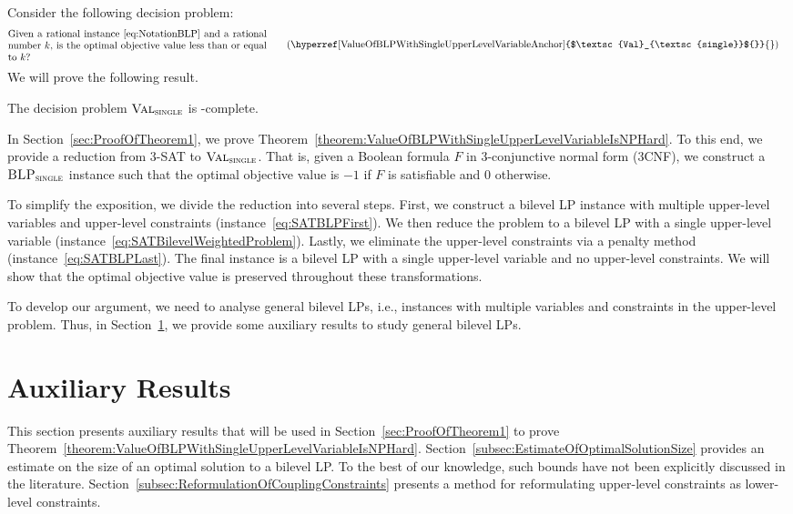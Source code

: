 \documentclass[runningheads,orivec]{llncs}
\newcommand{\MacroColor}[1]{#1}
\newcommand{\ComplexityClassStyle}[1]{#1}
\newcommand{\ClassNP}{\MacroColor{\text{\ComplexityClassStyle{NP}}}}
\newcommand{\ThreeSAT}{\MacroColor{\textsc{3-SAT}}}
\newcommand{\BLPWithSingleUpperLevelVariable}{\MacroColor{$\textsc{BLP}_{\textsc{single}}$}}
\newcommand{\ValueOfBLPWithSingleUpperLevelVariableName}{\MacroColor{$\textsc{Val}_{\textsc{single}}$}}
\newcommand{\ValueOfBLPWithSingleUpperLevelVariable}{\hyperref[ValueOfBLPWithSingleUpperLevelVariableAnchor]{\ValueOfBLPWithSingleUpperLevelVariableName{}}}
\newcommand{\SATBooleanFormula}{\MacroColor{F}}
\begin{document}
Consider the following decision problem:
\begin{align*}
& 
\parbox{0.75\textwidth}{Given a rational instance \eqref{eq:NotationBLP} and a rational 
number $k$, is the optimal objective value less than or equal to $k$?}
\label{ValueOfBLPWithSingleUpperLevelVariableAnchor}
\tag{\ValueOfBLPWithSingleUpperLevelVariable{}}
\end{align*}
We will prove the following result.

\begin{theorem}
\label{theorem:ValueOfBLPWithSingleUpperLevelVariableIsNPHard}
The decision problem \ValueOfBLPWithSingleUpperLevelVariable{} is \ClassNP{}-complete.
\end{theorem}

In Section~\ref{sec:ProofOfTheorem1}, we prove Theorem~\ref{theorem:ValueOfBLPWithSingleUpperLevelVariableIsNPHard}.
To this end, we provide a reduction from \ThreeSAT{} to \ValueOfBLPWithSingleUpperLevelVariable{}.
That is, given a Boolean formula $\SATBooleanFormula$ in 3-conjunctive normal form (3CNF), we construct a \BLPWithSingleUpperLevelVariable{} instance such that the optimal objective value is $-1$ if $\SATBooleanFormula$ is satisfiable and $0$ otherwise.

To simplify the exposition, we divide the reduction into several steps.
First, we construct a bilevel LP instance with multiple upper-level variables and upper-level constraints (instance~\ref{eq:SATBLPFirst}).
We then reduce the problem to a bilevel LP with a single upper-level variable (instance~\ref{eq:SATBilevelWeightedProblem}).
Lastly, we eliminate the upper-level constraints via a penalty method (instance~\ref{eq:SATBLPLast}).
The final instance is a bilevel LP with a single upper-level variable and no upper-level constraints.
We will show that the optimal objective value is preserved throughout these transformations.

To develop our argument, we need to analyse general bilevel LPs, i.e., instances with multiple variables and constraints in the upper-level problem.
Thus, in Section~\ref{sec:AuxiliaryResults}, we provide some auxiliary results to study general bilevel LPs.

\section{Auxiliary Results}
\label{sec:AuxiliaryResults}

This section presents auxiliary results that will be used in Section~\ref{sec:ProofOfTheorem1} to prove Theorem~\ref{theorem:ValueOfBLPWithSingleUpperLevelVariableIsNPHard}.
Section~\ref{subsec:EstimateOfOptimalSolutionSize} provides an estimate on the size of an optimal solution to a bilevel LP.
To the best of our knowledge, such bounds have not been explicitly discussed in the literature.
Section~\ref{subsec:ReformulationOfCouplingConstraints} presents a method for reformulating upper-level constraints as lower-level constraints.
\end{document}
